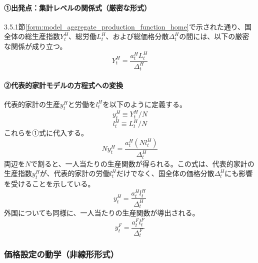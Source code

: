 \paragraph{①出発点：集計レベルの関係式（厳密な形式）}\label{sec:model_final_equations_pricing_prod_origin}
3.5.1節\eqref{form:model_aggregate_production_function_home}で示された通り、国全体の総生産指数\(Y_t^H\)、総労働\(L_t^H\)、および総価格分散\(\Delta_t^H\)の間には、以下の厳密な関係が成り立つ。
\begin{equation}
Y_t^H=\frac{a_t^HL_t^H}{\Delta_t^H}
\label{form:model_final_equations_pricing_prod_agg_restated}
\end{equation}

\paragraph{②代表的家計モデルの方程式への変換}\label{sec:model_final_equations_pricing_prod_ra_eq}
代表的家計の生産\(y_t^H\)と労働を\(l_t^H\)を以下のように定義する。
\begin{equation}
y_t^H\equiv Y_t^H/N
\label{form:model_final_equations_pricing_ra_y_h_def}
\end{equation}
\begin{equation}
l_t^H\equiv L_t^H/N
\label{form:model_final_equations_pricing_ra_l_h_def}
\end{equation}
これらを①式に代入する。
\begin{equation}
Ny_t^H=\frac{a_t^H(Nl_t^H)}{\Delta_t^H}
\label{form:model_final_equations_pricing_prod_derivation}
\end{equation}
両辺を\(N\)で割ると、一人当たりの生産関数が得られる。この式は、代表的家計の生産指数\(y_t^H\)が、代表的家計の労働\(l_t^H\)だけでなく、国全体の価格分散\(\Delta_t^H\)にも影響を受けることを示している。
\begin{equation}
y_t^H=\frac{a_t^Hl_t^H}{\Delta_t^H}
\label{form:model_final_equations_pricing_prod_h}
\end{equation}
外国についても同様に、一人当たりの生産関数が導出される。
\begin{equation}
y_t^F=\frac{a_t^Fl_t^F}{\Delta_t^F}
\label{form:model_final_equations_pricing_prod_f}
\end{equation}

\subsubsection{価格設定の動学（非線形形式）}
\label{sec:model_final_equations_pricing_dynamics}

